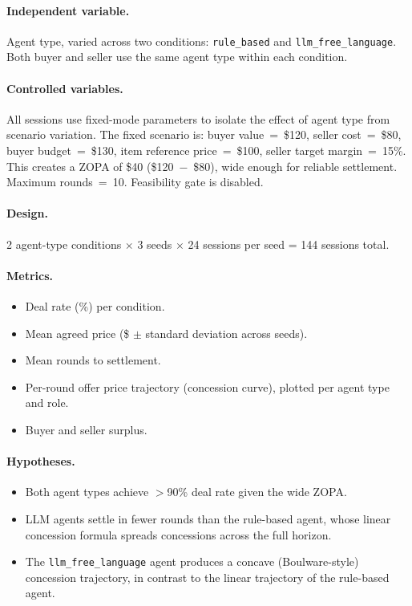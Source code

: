 \paragraph{Independent variable.}
Agent type, varied across two conditions: \texttt{rule\_based} and \texttt{llm\_free\_language}.  Both buyer and seller use the same agent type within each condition.

\paragraph{Controlled variables.}
All sessions use fixed-mode parameters to isolate the effect of agent type from scenario variation.  The fixed scenario is: buyer value~=~\$120, seller cost~=~\$80, buyer budget~=~\$130, item reference price~=~\$100, seller target margin~=~15\%.  This creates a ZOPA of \$40 (\$120~$-$~\$80), wide enough for reliable settlement.  Maximum rounds~=~10.  Feasibility gate is disabled.

\paragraph{Design.}
2 agent-type conditions $\times$ 3 seeds $\times$ 24 sessions per seed = 144 sessions total.

\paragraph{Metrics.}
\begin{itemize}
    \item Deal rate (\%) per condition.
    \item Mean agreed price (\$ $\pm$ standard deviation across seeds).
    \item Mean rounds to settlement.
    \item Per-round offer price trajectory (concession curve), plotted per agent type and role.
    \item Buyer and seller surplus.
\end{itemize}

\paragraph{Hypotheses.}
\begin{itemize}
    \item[\textbf{H-1a.}] Both agent types achieve $>$90\% deal rate given the wide ZOPA.
    \item[\textbf{H-1b.}] LLM agents settle in fewer rounds than the rule-based agent, whose linear concession formula spreads concessions across the full horizon.
    \item[\textbf{H-1c.}] The \texttt{llm\_free\_language} agent produces a concave (Boulware-style) concession trajectory, in contrast to the linear trajectory of the rule-based agent.
\end{itemize}





